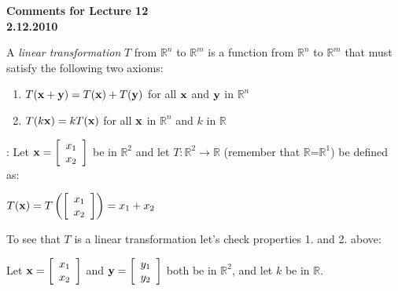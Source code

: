 \documentclass[12pt]{article}
\begin{document}
\begin{center}
{\large \bf Comments for Lecture 12}\\
\bf{2.12.2010}
\end{center}


  A {\it linear transformation} $T$ from $\mathbb{R}^n$ to $\mathbb{R}^m$ is a function from $\mathbb{R}^n$ to $\mathbb{R}^m$ that must satisfy the following two axioms:

\begin{enumerate}
\item $T({\bf x}+{\bf y})=T({\bf x})+T({\bf y})$ for all ${\bf x}$ and ${\bf y}$ in $\mathbb{R}^n$
\item $T(k{\bf x})=kT({\bf x})$ for all ${\bf x}$ in $\mathbb{R}^n$ and $k$ in $\mathbb{R}$
\end{enumerate}

:  Let ${\bf x}=\left[ \begin{array}{c} x_1 \\ x_2  \end{array} \right]$ be in $\mathbb{R}^2$ and let $T{:}\mathbb{R}^2 \rightarrow \mathbb{R}$ (remember that $\mathbb{R}$=$\mathbb{R}^1$) be defined as:

\begin{center}
$T({\bf x})=T\left(  \left[ \begin{array}{c} x_1 \\ x_2  \end{array} \right] \right)=x_1+x_2$
\end{center}

To see that $T$ is a linear transformation let's check properties 1. and 2. above:

Let ${\bf x}=\left[ \begin{array}{c} x_1 \\ x_2  \end{array} \right]$ and ${\bf y}=\left[ \begin{array}{c} y_1 \\ y_2  \end{array} \right]$ both be in $\mathbb{R}^2$, and let $k$ be in $\mathbb{R}$.
\end{document}
